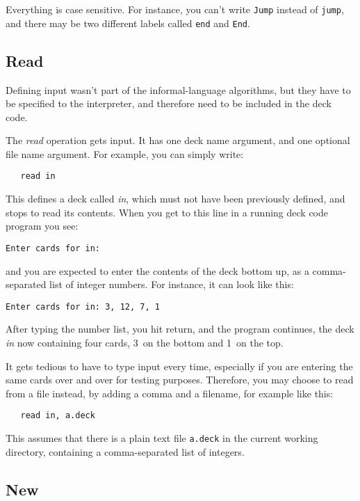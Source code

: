 \documentclass[a4paper,twoside]{tufte-handout}
\begin{document}
Everything is case sensitive. For instance, you can't write
\lstinline!Jump! instead of \lstinline!jump!, and there may be two
different labels called \lstinline!end! and \lstinline!End!.

\subsection{Read}\label{sec-input}

Defining input wasn't part of the informal-language algorithms, but
they have to be specified to the interpreter, and therefore need to be
included in the deck code.

The \emph{read} operation gets input. It has one deck name argument,
and one optional file name argument. For example, you can simply write:
\begin{lstlisting}
   read in
\end{lstlisting}

This defines a deck called \emph{in}, which must not have been
previously defined, and stops to read its contents. When you get to
this line in a running deck code program you see:
\begin{lstlisting}
Enter cards for in: 
\end{lstlisting}
and you are expected to enter the contents of the deck bottom up, as a
comma-separated list of integer numbers. For instance, it can look
like this:
\begin{lstlisting}
Enter cards for in: 3, 12, 7, 1
\end{lstlisting}
After typing the number list, you hit return, and the program
continues, the deck \emph{in} now containing four cards, 3~on the
bottom and 1~on the top.

It gets tedious to have to type input every time, especially if you
are entering the same cards over and over for testing
purposes. Therefore, you may choose to read from a file instead, by
adding a comma and a filename, for example like this:
\begin{lstlisting}
   read in, a.deck
\end{lstlisting}
This assumes that there is a plain text file \lstinline!a.deck! in the
current working directory, containing a comma-separated list of integers.

\subsection{New}\label{sec-new}
\end{document}

